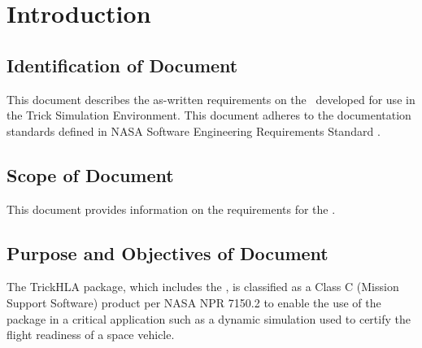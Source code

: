 \documentclass[twoside,11pt,titlepage]{report}
\begin{document}

\date{DATE}
\modelname{\MODEL}
\author{YOUR NAME}
\makeTrickhlaenvTitlepage



\tableofcontents
\vfill

\pagebreak


\chapter{Introduction}\label{sec:intro}



\section{Identification of Document}
This document describes the as-written requirements on the \MODEL\
developed for use in the Trick Simulation Environment.
This document adheres to the documentation standards defined in
NASA Software Engineering Requirements Standard \cite{NASA:SWE}.

\section{Scope of Document}
This document provides information on the requirements for
the \MODEL.

\section{Purpose and Objectives of Document}
The TrickHLA package, which includes the \MODEL,
is classified as a Class C (Mission Support Software)
product per NASA NPR 7150.2\cite{NASA:SWE}
to enable the use of the package in a critical
application such as a dynamic simulation
used to certify the flight readiness of a space vehicle.
\end{document}
